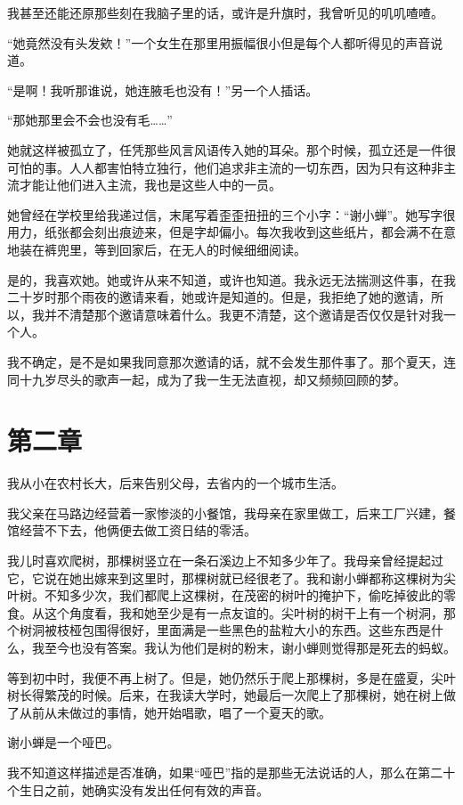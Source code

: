 \documentclass[lang=cn]{elegantpaper}
\begin{document}
我甚至还能还原那些刻在我脑子里的话，或许是升旗时，我曾听见的叽叽喳喳。

“她竟然没有头发欸！”一个女生在那里用振幅很小但是每个人都听得见的声音说道。

“是啊！我听那谁说，她连腋毛也没有！”另一个人插话。

“那她那里会不会也没有毛……”

她就这样被孤立了，任凭那些风言风语传入她的耳朵。那个时候，孤立还是一件很可怕的事。人人都害怕特立独行，他们追求非主流的一切东西，因为只有这种非主流才能让他们进入主流，我也是这些人中的一员。

她曾经在学校里给我递过信，末尾写着歪歪扭扭的三个小字：“谢小蝉”。她写字很用力，纸张都会刻出痕迹来，但是字却偏小。每次我收到这些纸片，都会满不在意地装在裤兜里，等到回家后，在无人的时候细细阅读。

是的，我喜欢她。她或许从来不知道，或许也知道。我永远无法揣测这件事，在我二十岁时那个雨夜的邀请来看，她或许是知道的。但是，我拒绝了她的邀请，所以，我并不清楚那个邀请意味着什么。我更不清楚，这个邀请是否仅仅是针对我一个人。

我不确定，是不是如果我同意那次邀请的话，就不会发生那件事了。那个夏天，连同十九岁尽头的歌声一起，成为了我一生无法直视，却又频频回顾的梦。
\section{第二章}
\label{sec:org6dd1647}

我从小在农村长大，后来告别父母，去省内的一个城市生活。

我父亲在马路边经营着一家惨淡的小餐馆，我母亲在家里做工，后来工厂兴建，餐馆经营不下去，他俩便去做工资日结的零活。

我儿时喜欢爬树，那棵树竖立在一条石溪边上不知多少年了。我母亲曾经提起过它，它说在她出嫁来到这里时，那棵树就已经很老了。我和谢小蝉都称这棵树为尖叶树。不知多少次，我们都爬上这棵树，在茂密的树叶的掩护下，偷吃掉彼此的零食。从这个角度看，我和她至少是有一点友谊的。尖叶树的树干上有一个树洞，那个树洞被枝桠包围得很好，里面满是一些黑色的盐粒大小的东西。这些东西是什么，我至今也没有答案。我认为他们是树的粉末，谢小蝉则觉得那是死去的蚂蚁。

等到初中时，我便不再上树了。但是，她仍然乐于爬上那棵树，多是在盛夏，尖叶树长得繁茂的时候。后来，在我读大学时，她最后一次爬上了那棵树，她在树上做了从前从未做过的事情，她开始唱歌，唱了一个夏天的歌。

谢小蝉是一个哑巴。

我不知道这样描述是否准确，如果“哑巴”指的是那些无法说话的人，那么在第二十个生日之前，她确实没有发出任何有效的声音。
\end{document}
